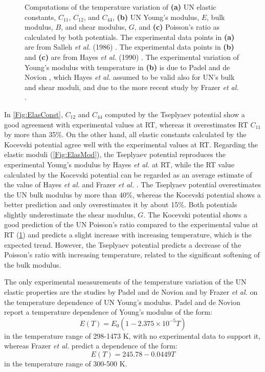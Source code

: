 \documentclass[preprint, 12pt]{elsarticle}
\begin{document}
\begin{figure}[h!]
\begin{subfigure}{0.45\textwidth}
    \caption{}
    \label{Fig:Poisson}
\end{subfigure}
\caption{Computations of the temperature variation of \textbf{(a)} UN elastic constants, $C_{11}$, $C_{12}$, and $C_{44}$, \textbf{(b)} UN Young's modulus, $E$, bulk modulus, $B$, and shear modulus, $G$, and \textbf{(c)} Poisson's ratio as calculated by both potentials. The experimental data points in \textbf{(a)} are from Salleh \textit{et al.} (1986) \cite{Salleh1986}. The experimental data points in \textbf{(b)} and \textbf{(c)} are from Hayes \textit{et al.} (1990) \cite{Hayes1990II}. The experimental variation of Young's modulus with temperature in \textbf{(b)} is due to Padel and de Novion \cite{Padel1969}, which Hayes \textit{et al.} assumed to be valid also for UN's bulk and shear moduli, and due to the more recent study by Frazer \textit{et al.} \cite{Frazer2021}.}
\label{Fig:EC}
\end{figure}

In \cref{Fig:ElasConst}, $C_{12}$ and $C_{44}$ computed by the Tseplyaev potential show a good agreement with experimental values at RT, whereas it overestimates RT $C_{11}$ by more than 35\%. On the other hand, all elastic constants calculated by the Kocevski potential agree well with the experimental values at RT. Regarding the elastic moduli (\cref{Fig:ElasMod}), the Tseplyaev potential reproduces the experimental Young's modulus by Hayes \textit{et al.} \cite{Hayes1990II} at RT, while the RT value calculated by the Kocevski potential can be regarded as an average estimate of the value of Hayes \textit{et al.} \cite{Hayes1990II} and Frazer \textit{et al.} \cite{Frazer2021}. The Tseplyaev potential overestimates the UN bulk modulus by more than 40\%, whereas the Kocevski potential shows a better prediction and only overestimates it by about 15\%. Both potentials slightly underestimate the shear modulus, $G$. The Kocevski potential shows a good prediction of the UN Poisson's ratio compared to the experimental value at RT (\cref{Fig:Poisson}) and predicts a slight increase with increasing temperature, which is the expected trend. However, the Tseplyaev potential predicts a decrease of the Poisson's ratio with increasing temperature, related to the significant softening of the bulk modulus.

The only experimental measurements of the temperature variation of the UN elastic properties are the studies by Padel and de Novion \cite{Padel1969} and by Frazer \textit{et al.} \cite{Frazer2021} on the temperature dependence of UN Young's modulus. Padel and de Novion \cite{Padel1969} report a temperature dependence of Young's modulus of the form:
\begin{equation}
E(T)= E_0 \left( 1-2.375 \times 10^{-5} T \right)
\label{Eq:Padel}
\end{equation}
in the temperature range of 298-1473 K, with no experimental data to support it, whereas Frazer \textit{et al.} predict a dependence of the form:
\begin{equation}
E(T) = 245.78 - 0.0449 T
\label{Eq:Frazer}
\end{equation}
in the temperature range of 300-500 K.
\end{document}
